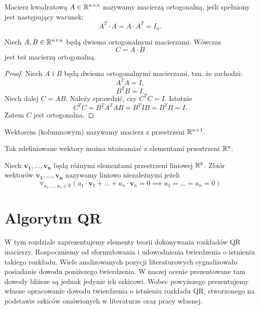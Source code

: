 \documentclass[12pt,a4paper]{report}
\newcommand{\vr}[1]{\mathbf{#1}}
\newcommand{\mx}[1]{{#1}}
\begin{document}
\begin{definition}
Macierz kwadratową $\mx{A}\in \setR^{n\times n}$ nazywamy macierzą ortogonalną, jeśli spełniony jest następujący warunek:
$$
\mx{A}^{T}\cdot \mx{A}=\mx{A}\cdot \mx{A}^{T}=\mx{I}_{n}.
$$
\end{definition}

\begin{lemma}
Niech $\mx{A},\mx{B} \in \setR^{n \times n }$ będą dwiema ortogonalnymi macierzami. Wówczas 
$$
\mx{C}=\mx{A}\cdot \mx{B}
$$
jest też macierzą ortogonalną. 
\end{lemma}

\begin{proof}
Niech $\mx{A}$ i $\mx{B}$ będą dwiema ortogonalnymi macierzami, tzn. że zachodzi:
$$
\mx{A}^{T}\mx{A} = \mx{I},
$$
$$
\mx{B}^{T}\mx{B} = \mx{I}.
$$
Niech dalej $\mx{C}=\mx{A}\mx{B}$. Należy sprawdzić, czy $\mx{C}^{T}\mx{C}=\mx{I}$. Istotnie
$$
\mx{C}^{T}\mx{C} = \mx{B}^{T}\mx{A}^{T}\mx{A}\mx{B} = \mx{B}^{T}\mx{I}\mx{B} = \mx{B}^{T}\mx{B} = \mx{I}.
$$
Zatem $\mx{C}$ jest ortogonalna.
\end{proof}

\begin{definition}
Wektorem (kolumnowym) nazywamy macierz z przestrzeni $\mathbb{R}^{n\times 1}.$
\end{definition}

Tak zdefiniowane wektory można utożsamiać z elementami przestrzeni $\mathbb{R}^{n}.$

\begin{definition}
Niech $\vr{v_{1}},..., \vr{v_{n}}$ będą różnymi elementami przestrzeni liniowej $\mathbb{R}^{k}$. Zbiór wektorów ${\vr{v_{1}},...,\vr{v_{n}}}$ nazywamy liniowo niezależnymi jeżeli 
$$
\forall_{a_{1},...,a_{n}\in \mathbb{R}} (a_{1}\cdot \vr{v}_{1} + ... + a_{n}\cdot \vr{v}_{n} = 0 \implies a_{1}=...=a_{n}=0)
$$ 
\end{definition}


\chapter{Algorytm QR}

W tym rozdziale zaprezentujemy elementy teorii dokonywania rozkładów QR macierzy. Rozpoczniemy od sformułowania i udowodnienia twierdzenia o istnieniu takiego rozkładu. Wiele analizowanych pozycji literaturowych sygnalizowało posiadanie dowodu poniższego twierdzenia. W naszej ocenie prezentowane tam dowody bliższe są jednak jedynie ich szkicowi. Wobec powyższego prezentujemy własne opracowanie dowodu twierdzenia o istnieniu rozkładu QR, stworzonego na podstawie szkiców omówionych w literaturze oraz pracy własnej. 
\end{document}
